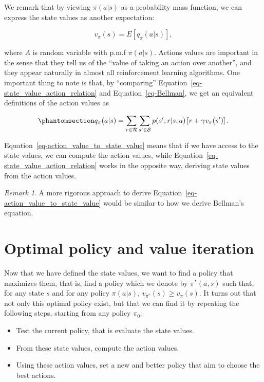 \documentclass[
  letterpaper,
]{report}
\providecommand{\tightlist}{%
  \setlength{\itemsep}{0pt}\setlength{\parskip}{0pt}}\usepackage{longtable,booktabs,array}
\theoremstyle{definition}
\theoremstyle{plain}
\theoremstyle{definition}
\theoremstyle{remark}
\newtheorem*{remark}{Remark}
\begin{document}
We remark that by viewing \(\pi(a|s)\) as a probability mass function,
we can express the state values as another expectation:

\[
v_\pi(s) = E[q_\pi(a|s)],
\]

where \(A\) is random variable with p.m.f \(\pi(a|s)\). Actions values
are important in the sense that they tell us of the ``value of taking an
action over another'', and they appear naturally in almost all
reinforcement learning algorithms. One important thing to note is that,
by ``comparing'' Equation~\ref{eq-state_value_action_relation} and
Equation~\ref{eq-Bellman}, we get an equivalent definitions of the
action values as

\begin{equation}\phantomsection\label{eq-action_value_to_state_value}{
q_\pi(a|s) = \sum_{r\in\mathcal{R}}\sum_{s'\in\mathcal{S}}p(s',r|s,a)\left[ r + \gamma v_\pi(s')\right].
}\end{equation}

Equation~\ref{eq-action_value_to_state_value} means that if we have
access to the state values, we can compute the action values, while
Equation~\ref{eq-state_value_action_relation} works in the opposite way,
deriving state values from the action values.

\begin{remark}
A more rigorous approach to derive
Equation~\ref{eq-action_value_to_state_value} would be similar to how we
derive Bellman's equation.
\end{remark}

\section{Optimal policy and value
iteration}\label{optimal-policy-and-value-iteration}

Now that we have defined the state values, we want to find a policy that
maximizes them, that is, find a policy which we denote by \(\pi^*(a,s)\)
such that, for any state \(s\) and for any policy \(\pi(a|s)\),
\(v_{\pi^*}(s)\geq v_\pi(s)\). It turns out that not only this optimal
policy exist, but that we can find it by repeating the following steps,
starting from any policy \(\pi_0\):

\begin{itemize}
\tightlist
\item
  Test the current policy, that is evaluate the state values.
\item
  From these state values, compute the action values.
\item
  Using these action values, set a new and better policy that aim to
  choose the best actions.
\end{itemize}
\end{document}
